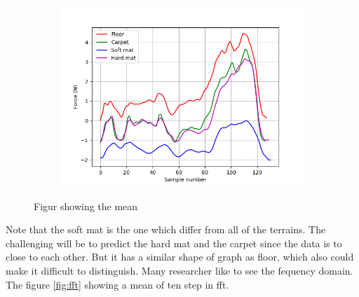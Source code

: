 \documentclass[USenglish]{ifimaster}  %
\begin{document}
\begin{figure}[h]
\begin{subfigure}{\linewidth}
\includegraphics[scale=0.42]{Figures/meanz}
\caption{}
\label{fig:sub3}
\end{subfigure}
\caption{Figur showing the mean}
\label{fig:meanx}
\end{figure}






\FloatBarrier
Note that the soft mat is the one which differ from all of the terrains. The challenging will be to predict the hard mat and the carpet since the data is to close to each other. But it has a similar shape of graph as floor, which also could make it difficult to distinguish. Many researcher like to see the fequency domain. The figure \ref{fig:fft} showing a mean of ten step in fft.
\end{document}
